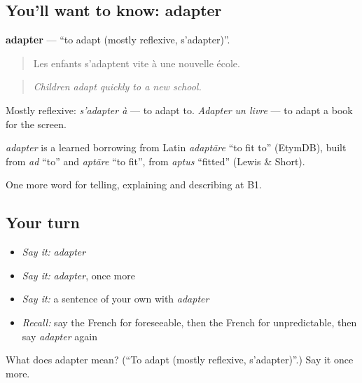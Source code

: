 \subsection*{You'll want to know: adapter}
\textbf{adapter} — \textquotedblleft{}to adapt (mostly reflexive, s'adapter)\textquotedblright{}.

\begin{quote}
Les enfants s'adaptent vite à une nouvelle école.
\end{quote}

\begin{quote}
\emph{Children adapt quickly to a new school.}
\end{quote}

Mostly reflexive: \emph{s'adapter à} — to adapt to. \emph{Adapter un livre} — to adapt a book for the screen.

\begin{cousinweb}
\emph{adapter} is a learned borrowing from Latin \emph{adaptāre} \textquotedblleft{}to fit to\textquotedblright{} (EtymDB), built from \emph{ad} \textquotedblleft{}to\textquotedblright{} and \emph{aptāre} \textquotedblleft{}to fit\textquotedblright{}, from \emph{aptus} \textquotedblleft{}fitted\textquotedblright{} (Lewis \& Short).
\end{cousinweb}

\begin{grammarlens}[title={What you've built}]
One more word for telling, explaining and describing at B1.
\end{grammarlens}

\subsection*{Your turn}
\begin{itemize}
\raggedright
  \item \emph{Say it:} \emph{adapter}
  \item \emph{Say it:} \emph{adapter}, once more
  \item \emph{Say it:} a sentence of your own with \emph{adapter}
  \item \emph{Recall:} say the French for foreseeable, then the French for unpredictable, then say \emph{adapter} again
\end{itemize}

\begin{tcolorbox}[breakable,colback=teal!4,colframe=teal!35!black,title={Before you move on}]
What does adapter mean? (\textquotedblleft{}To adapt (mostly reflexive, s'adapter)\textquotedblright{}.) Say it once more.
\end{tcolorbox}
